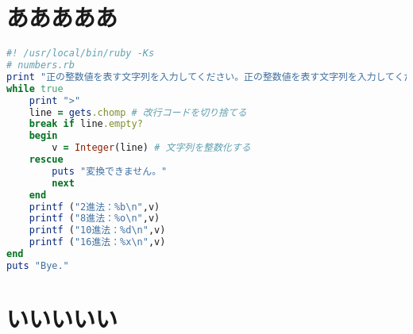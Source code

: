 
\appendix %
\chapter{あああああ}



\begin{lstlisting}[language=ruby,caption=スパゲッティソース,label=test.rb]
#! /usr/local/bin/ruby -Ks
# numbers.rb
print "正の整数値を表す文字列を入力してください。正の整数値を表す文字列を入力してください。\n"
while true
	print ">"
	line = gets.chomp # 改行コードを切り捨てる
	break if line.empty?
	begin
		v = Integer(line) # 文字列を整数化する
	rescue
		puts "変換できません。"
		next
	end
	printf ("2進法：%b\n",v)
	printf ("8進法：%o\n",v)
	printf ("10進法：%d\n",v)
	printf ("16進法：%x\n",v)
end
puts "Bye."
\end{lstlisting}
\chapter{いいいいい}

